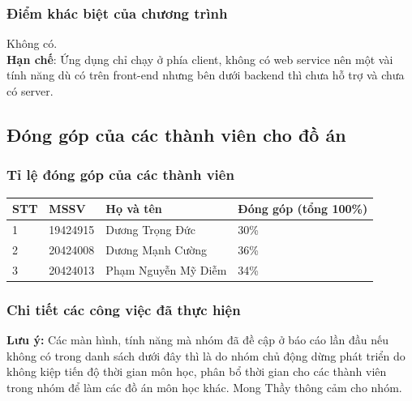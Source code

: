 \documentclass[12pt]{article}
\begin{document}
\subsubsection{Điểm khác biệt của chương trình}
Không có.\\
\indent \textbf{Hạn chế}: Ứng dụng chỉ chạy ở phía client, không có web service nên một vài tính năng dù có trên front-end nhưng bên dưới backend thì chưa hỗ trợ và chưa có server.

\subsection{Đóng góp của các thành viên cho đồ án}
\subsubsection{Tỉ lệ đóng góp của các thành viên}
\begin{tabular}{ |p{1cm}||p{3cm}|p{6cm}|p{5cm}|  }
    \hline
    \textbf{STT} & \textbf{MSSV} & \textbf{Họ và tên}  & \textbf{Đóng góp} (tổng 100\%) \\
    \hline \hline
    1            & 19424915      & Dương Trọng Đức     & 30\%                           \\ \hline
    2            & 20424008      & Dương Mạnh Cường    & 36\%                           \\ \hline
    3            & 20424013      & Phạm Nguyễn Mỹ Diễm & 34\%                           \\
    \hline
\end{tabular}

\subsubsection{Chi tiết các công việc đã thực hiện}
\textbf{Lưu ý:} Các màn hình, tính năng mà nhóm đã đề cập ở báo cáo lần đầu nếu không có trong danh sách dưới đây thì là do nhóm chủ động dừng phát triển do không kiệp tiến độ thời gian môn học, phân bổ thời gian cho các thành viên trong nhóm để làm các đồ án môn học khác. Mong Thầy thông cảm cho nhóm.\\\\
\end{document}
